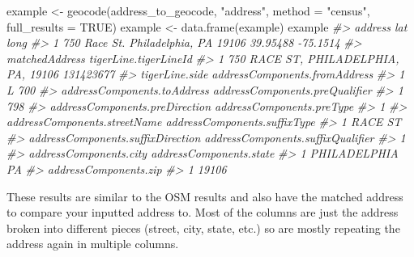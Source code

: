 \documentclass[
]{krantz}
\makeatletter
\newenvironment{Shaded}{\begin{snugshade}}{\end{snugshade}}
\newcommand{\AttributeTok}[1]{\textcolor[rgb]{0.61,0.61,0.61}{#1}}
\newcommand{\CommentTok}[1]{\textcolor[rgb]{0.37,0.37,0.37}{\textit{#1}}}
\newcommand{\ConstantTok}[1]{\textcolor[rgb]{0,0,0}{#1}}
\newcommand{\FunctionTok}[1]{\textcolor[rgb]{0,0,0}{#1}}
\newcommand{\NormalTok}[1]{#1}
\newcommand{\OtherTok}[1]{\textcolor[rgb]{0.37,0.37,0.37}{#1}}
\newcommand{\StringTok}[1]{\textcolor[rgb]{0.5,0.5,0.5}{#1}}
\newenvironment{kframe}{%
\medskip{}
\setlength{\fboxsep}{.8em}
 \def\at@end@of@kframe{}%
 \ifinner\ifhmode%
  \def\at@end@of@kframe{\end{minipage}}%
  \begin{minipage}{\columnwidth}%
 \fi\fi%
 \def\FrameCommand##1{\hskip\@totalleftmargin \hskip-\fboxsep
 \colorbox{shadecolor}{##1}\hskip-\fboxsep
     \hskip-\linewidth \hskip-\@totalleftmargin \hskip\columnwidth}%
 \MakeFramed {\advance\hsize-\width
   \@totalleftmargin\z@ \linewidth\hsize
   \@setminipage}}%
 {\par\unskip\endMakeFramed%
 \at@end@of@kframe}
\renewenvironment{Shaded}{\begin{kframe}}{\end{kframe}}
\makeatother
\begin{document}
\begin{Shaded}
\begin{Highlighting}[]
\NormalTok{example }\OtherTok{\textless{}{-}} \FunctionTok{geocode}\NormalTok{(address\_to\_geocode, }\StringTok{"address"}\NormalTok{, }\AttributeTok{method =} \StringTok{"census"}\NormalTok{, }\AttributeTok{full\_results =} \ConstantTok{TRUE}\NormalTok{)}
\NormalTok{example }\OtherTok{\textless{}{-}} \FunctionTok{data.frame}\NormalTok{(example)}
\NormalTok{example}
\CommentTok{\#\textgreater{}                               address      lat     long}
\CommentTok{\#\textgreater{} 1 750 Race St. Philadelphia, PA 19106 39.95488 {-}75.1514}
\CommentTok{\#\textgreater{}                         matchedAddress tigerLine.tigerLineId}
\CommentTok{\#\textgreater{} 1 750 RACE ST, PHILADELPHIA, PA, 19106             131423677}
\CommentTok{\#\textgreater{}   tigerLine.side addressComponents.fromAddress}
\CommentTok{\#\textgreater{} 1              L                           700}
\CommentTok{\#\textgreater{}   addressComponents.toAddress addressComponents.preQualifier}
\CommentTok{\#\textgreater{} 1                         798                               }
\CommentTok{\#\textgreater{}   addressComponents.preDirection addressComponents.preType}
\CommentTok{\#\textgreater{} 1                                                         }
\CommentTok{\#\textgreater{}   addressComponents.streetName addressComponents.suffixType}
\CommentTok{\#\textgreater{} 1                         RACE                           ST}
\CommentTok{\#\textgreater{}   addressComponents.suffixDirection addressComponents.suffixQualifier}
\CommentTok{\#\textgreater{} 1                                                                    }
\CommentTok{\#\textgreater{}   addressComponents.city addressComponents.state}
\CommentTok{\#\textgreater{} 1           PHILADELPHIA                      PA}
\CommentTok{\#\textgreater{}   addressComponents.zip}
\CommentTok{\#\textgreater{} 1                 19106}
\end{Highlighting}
\end{Shaded}

These results are similar to the OSM results and also have the matched address to compare your inputted address to. Most of the columns are just the address broken into different pieces (street, city, state, etc.) so are mostly repeating the address again in multiple columns.
\end{document}
